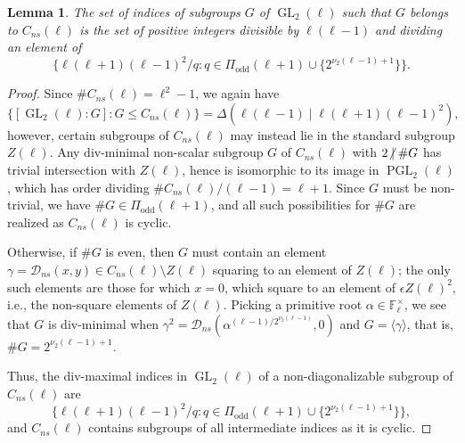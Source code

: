 \documentclass[table,dvipsnames]{amsart}
\newcommand{\F}{\mathbb{F}}
\newcommand{\GL}{\operatorname{GL}}
\newcommand{\PGL}{\operatorname{PGL}}
\newcommand{\angles}[1]{\langle #1\rangle}
\newcommand{\odd}{\mathrm{odd}}
\newcommand{\ndiv}{\centernot|}
\newtheorem{lemma}[theorem]{Lemma}
\numberwithin{equation}{section}
\newcommand{\ns}{\textit{ns}}
\newcommand{\Cns}{C_\ns}
\begin{document}
\begin{lemma}
\label{lem:fcns}
The set of indices of subgroups $G$ of $\GL_2(\ell)$ such that $G$ belongs to $\Cns(\ell)$ is the set of positive integers divisible by $\ell(\ell-1)$ and dividing an element of
\begin{equation*}
\{\ell(\ell+1)(\ell-1)^2/q:q\in\Pi_\odd(\ell+1)\cup\{2^{\nu_2(\ell-1)+1}\}\}.
\end{equation*}
\end{lemma}
\begin{proof}
Since $\#\Cns(\ell)=\ell^2-1$, we again have
\begin{equation*}
\{[\GL_2(\ell):G]:G\le\Cns(\ell)\}=\Delta(\ell(\ell-1)\mid\ell(\ell+1)(\ell-1)^2),
\end{equation*}
however, certain subgroups of $\Cns(\ell)$ may instead lie in the standard subgroup $Z(\ell)$. Any div-minimal non-scalar subgroup $G$ of $\Cns(\ell)$ with $2\ndiv\#G$ has trivial intersection with $Z(\ell)$, hence is isomorphic to its image in $\PGL_2(\ell)$, which has order dividing $\#\Cns(\ell)/(\ell-1)=\ell+1$. Since $G$ must be non-trivial, we have $\#G\in\Pi_\odd(\ell+1)$, and all such possibilities for $\#G$ are realized as $\Cns(\ell)$ is cyclic.

Otherwise, if $\#G$ is even, then $G$ must contain an element $\gamma=\mathcal{D}_\ns(x,y)\in\Cns(\ell)\setminus Z(\ell)$ squaring to an element of $Z(\ell)$; the only such elements are those for which $x=0$, which square to an element of $\epsilon Z(\ell)^2$, i.e., the non-square elements of $Z(\ell)$. Picking a primitive root $\alpha\in\F_\ell^\times$, we see that $G$ is div-minimal when $\gamma^2=\mathcal{D}_\ns(\alpha^{(\ell-1)/2^{\nu_2(\ell-1)}},0)$ and $G=\angles{\gamma}$, that is, $\#G=2^{\nu_2(\ell-1)+1}$.

Thus, the div-maximal indices in $\GL_2(\ell)$ of a non-diagonalizable subgroup of $\Cns(\ell)$ are
\begin{equation*}
\{\ell(\ell+1)(\ell-1)^2/q:q\in\Pi_\odd(\ell+1)\cup\{2^{\nu_2(\ell-1)+1}\}\},
\end{equation*}
and $\Cns(\ell)$ contains subgroups of all intermediate indices as it is cyclic.
\end{proof}
\end{document}
